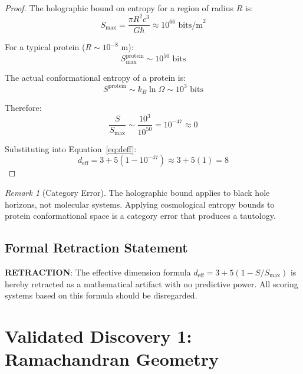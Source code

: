 \documentclass[11pt,a4paper]{article}
\theoremstyle{plain}
\theoremstyle{definition}
\theoremstyle{remark}
\newtheorem{remark}[theorem]{Remark}
\newcommand{\deff}{d_{\text{eff}}}
\newcommand{\Smax}{S_{\text{max}}}
\begin{document}
\begin{proof}
The holographic bound on entropy for a region of radius $R$ is:
\begin{equation}
    \Smax = \frac{\pi R^2 c^3}{G\hbar} \approx 10^{66} \text{ bits/m}^2
\end{equation}

For a typical protein ($R \sim 10^{-8}$ m):
\begin{equation}
    \Smax^{\text{protein}} \sim 10^{50} \text{ bits}
\end{equation}

The actual conformational entropy of a protein is:
\begin{equation}
    S^{\text{protein}} \sim k_B \ln \Omega \sim 10^{3} \text{ bits}
\end{equation}

Therefore:
\begin{equation}
    \frac{S}{\Smax} \sim \frac{10^{3}}{10^{50}} = 10^{-47} \approx 0
\end{equation}

Substituting into Equation~\ref{eq:deff}:
\begin{equation}
    \deff = 3 + 5(1 - 10^{-47}) \approx 3 + 5(1) = 8
\end{equation}
\end{proof}

\begin{remark}[Category Error]
The holographic bound applies to black hole horizons, not molecular systems. Applying cosmological entropy bounds to protein conformational space is a category error that produces a tautology.
\end{remark}

\subsection{Formal Retraction Statement}

\begin{center}
\colorbox{retractedcolor}{\parbox{0.9\textwidth}{
\textbf{RETRACTION}: The effective dimension formula $\deff = 3 + 5(1 - S/\Smax)$ is hereby retracted as a mathematical artifact with no predictive power. All scoring systems based on this formula should be disregarded.
}}
\end{center}

\section{Validated Discovery 1: Ramachandran Geometry}
\end{document}
